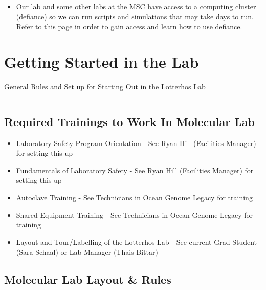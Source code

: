 \documentclass[
  letterpaper,
  DIV=11,
  numbers=noendperiod]{scrreprt}
\providecommand{\tightlist}{%
  \setlength{\itemsep}{0pt}\setlength{\parskip}{0pt}}\usepackage{longtable,booktabs,array}
\begin{document}
\begin{itemize}
\tightlist
\item
  Our lab and some other labs at the MSC have access to a computing
  cluster (defiance) so we can run scripts and simulations that may take
  days to run. Refer to
  \href{https://drk-lo.github.io/lotterhoslabprotocols/defiance/}{this
  page} in order to gain access and learn how to use defiance.
\end{itemize}

\hypertarget{getting-started-in-the-lab}{%
\chapter{Getting Started in the Lab}\label{getting-started-in-the-lab}}

General Rules and Set up for Starting Out in the Lotterhos Lab

\begin{center}\rule{0.5\linewidth}{0.5pt}\end{center}

\hypertarget{required-trainings-to-work-in-molecular-lab}{%
\section*{\texorpdfstring{\textbf{Required Trainings to Work In
Molecular
Lab}}{Required Trainings to Work In Molecular Lab}}\label{required-trainings-to-work-in-molecular-lab}}

\begin{itemize}
\item
  Laboratory Safety Program Orientation - See Ryan Hill (Facilities
  Manager) for setting this up
\item
  Fundamentals of Laboratory Safety - See Ryan Hill (Facilities Manager)
  for setting this up
\item
  Autoclave Training - See Technicians in Ocean Genome Legacy for
  training
\item
  Shared Equipment Training - See Technicians in Ocean Genome Legacy for
  training
\item
  Layout and Tour/Labelling of the Lotterhos Lab - See current Grad
  Student (Sara Schaal) or Lab Manager (Thais Bittar)
\end{itemize}

\hypertarget{molecular-lab-layout-rules}{%
\section*{\texorpdfstring{\textbf{Molecular Lab Layout \&
Rules}}{Molecular Lab Layout \& Rules}}\label{molecular-lab-layout-rules}}
\end{document}
